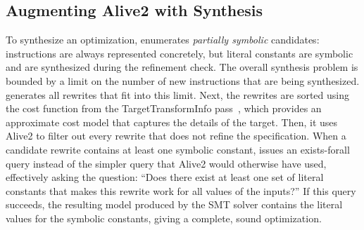 



\subsection{Augmenting Alive2 with Synthesis}

To synthesize an optimization, \tool{} enumerates \emph{partially
symbolic} candidates: instructions are always represented concretely,
but literal constants are symbolic and are synthesized during the
refinement check.
%
The overall synthesis problem is bounded by a limit on the number of
new instructions that are being synthesized.
%
\tool{} generates all rewrites that fit into this limit.
%
Next, the rewrites are sorted using the cost function
from the TargetTransformInfo pass~\cite{tti}, which provides an approximate cost
model that captures the details of the target.
%
Then, it uses Alive2 to filter out every rewrite that does not refine
the specification.
%
When a candidate rewrite contains at least one symbolic constant,
\tool{} issues an exists-forall query instead of the simpler query
that Alive2 would otherwise have used, effectively asking the
question: ``Does there exist at least one set of literal constants
that makes this rewrite work for all values of the inputs?''
%
If this query succeeds, the resulting model produced by the SMT solver contains
the literal values for the symbolic constants, giving a complete,
sound optimization.


